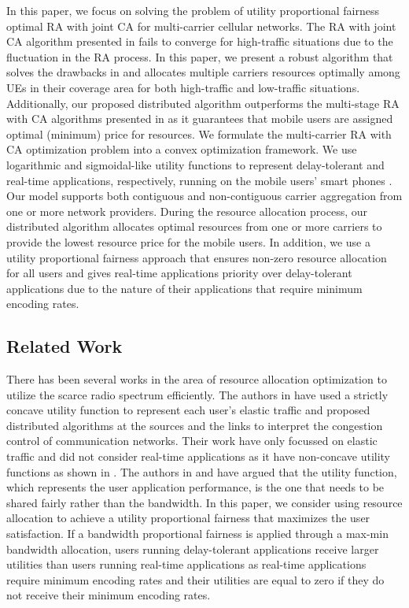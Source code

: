 \documentclass[journal]{IEEEtran} 		\usepackage{amsmath,amssymb}
\begin{document}
In this paper, we focus on solving the problem of utility proportional fairness optimal RA with joint CA for multi-carrier cellular networks. The RA with joint CA algorithm presented in \cite{Ahmed_Utility4} fails to converge for high-traffic situations due to the fluctuation in the RA process. In this paper, we present a robust algorithm that solves the drawbacks in \cite{Ahmed_Utility4} and allocates multiple carriers resources optimally among UEs in their coverage area for both high-traffic and low-traffic situations. Additionally, our proposed distributed algorithm outperforms the multi-stage RA with CA algorithms presented in \cite{Haya_Utility1,Haya_Utility3,Haya_Utility6} as it guarantees that mobile users are assigned optimal (minimum) price for resources. We formulate the multi-carrier RA with CA optimization problem into a convex optimization framework. We use logarithmic and sigmoidal-like utility functions to represent delay-tolerant and real-time applications, respectively, running on the mobile
users' smart phones \cite{Ahmed_Utility1}. Our model supports both contiguous and non-contiguous carrier aggregation from one or more network providers. During the resource allocation process, our distributed algorithm allocates optimal resources from one or more carriers to provide the lowest resource price for the mobile users. In addition, we use a utility proportional fairness approach that ensures non-zero resource allocation for all users and gives real-time applications priority over delay-tolerant applications due to the nature of their applications that require minimum encoding rates.

\subsection{Related Work}\label{sec:related}

There has been several works in the area of resource allocation optimization to utilize the scarce radio spectrum efficiently.
The authors in \cite{kelly98ratecontrol,Internet_Congestion,Optimization_flow,Fair_endtoend} have used a strictly concave utility function to represent each user's elastic traffic and proposed distributed algorithms at the sources and the links to interpret the congestion control of communication networks. Their work have only focussed on elastic traffic and did not consider real-time applications as it have non-concave utility functions as shown in \cite{fundamental_design}. The authors in \cite{Utility_max-min} and \cite{ Fair_allocation} have argued that the utility function, which represents the user application performance, is the one that needs to be shared fairly rather than the bandwidth. In this paper, we consider using resource allocation to achieve a utility proportional fairness that maximizes the user satisfaction. If a bandwidth proportional fairness is applied through a max-min bandwidth allocation, users running delay-tolerant applications receive larger utilities than users running real-time
applications as real-time applications require minimum encoding rates and their utilities are equal to zero if they do not receive their minimum encoding rates.
\end{document}
